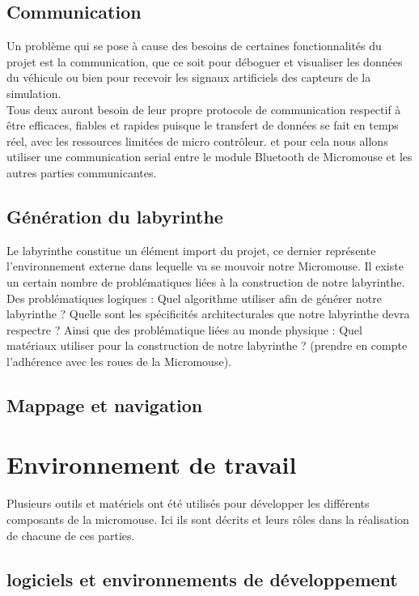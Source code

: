 \subsection{Communication} \label{sec:mapMaze}
Un problème qui se pose à cause des besoins de certaines fonctionnalités du
projet est la communication, que ce soit pour déboguer et visualiser les
données du véhicule ou bien pour recevoir les signaux artificiels des capteurs
de la simulation. \\

Tous deux auront besoin de leur propre protocole de communication respectif
à être efficaces, fiables et rapides puisque le transfert de données se fait en
temps réel, avec les ressources limitées de micro contrôleur. et pour cela nous
allons utiliser une communication serial entre le module Bluetooth de Micromouse
et les autres parties communicantes.

\subsection{Génération du labyrinthe}
Le labyrinthe constitue un élément import du projet, ce dernier représente l’environnement externe dans lequelle va se mouvoir notre Micromouse. Il existe un certain nombre de problématiques liées à la construction de notre labyrinthe. Des problématiques logiques : Quel algorithme utiliser afin de générer notre labyrinthe ? Quelle sont les spécificités architecturales que notre labyrinthe devra respectre ? 
Ainsi que des problématique liées au monde physique : Quel matériaux utiliser pour la construction de notre labyrinthe ? (prendre en compte l’adhérence avec les roues de la Micromouse).
\subsection{Mappage et navigation} \label{sec:rechChem} 

\section{Environnement de travail} \label{sec:environnement}
   Plusieurs outils et matériels ont été utilisés pour développer les
différents composants de la micromouse. Ici ils sont décrits et leurs rôles
dans la réalisation de chacune de ces parties.

\subsection{logiciels et environnements de développement} \label{subsec:softDev} 

